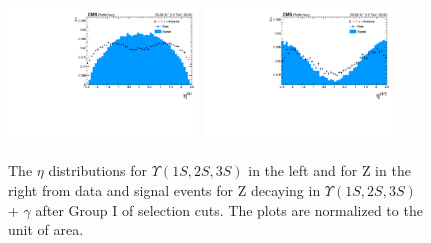 \begin{figure}[!htbp]
\begin{center}
\includegraphics[width=0.45\textwidth]{figures/outputPlots/ZtoUpsilon_Cat0_ZZZZZ/au/data_x_mc/noKinCuts/h_noKin_Upsilon_eta}\hspace*{1.cm}
\includegraphics[width=0.45\textwidth]{figures/outputPlots/ZtoUpsilon_Cat0_ZZZZZ/au/data_x_mc/noKinCuts/h_noKin_Z_eta}
\end{center}\vspace*{-.5cm}
\caption{The $\eta$ distributions for $\Upsilon(1S,2S,3S)$ in the left and for Z in the right from data and signal events for Z decaying in $\Upsilon(1S,2S,3S)$ + $\gamma$ after Group I of selection cuts. The plots are normalized to the unit of area.}
\label{fig:etaUpsilon_and_Z_ZtoUpsilon_Cat0}
\end{figure}

